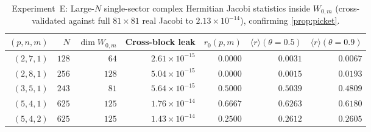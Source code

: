 \documentclass[11pt,a4paper]{article}
\numberwithin{equation}{section}
\theoremstyle{plain}
\theoremstyle{definition}
\theoremstyle{remark}
\begin{document}
\begin{table}[ht]
\centering
\caption{Experiment~E: Large-$N$ single-sector complex Hermitian Jacobi statistics inside $W_{0,m}$ (cross-validated against full $81\times 81$ real Jacobi to $2.13\times 10^{-14}$), confirming \cref{prop:picket}.}
\label{tab:frontier}
\footnotesize
\setlength{\tabcolsep}{4.5pt}
\begin{tabular}{@{}rrrrrrr@{}}
\toprule
$(p, n, m)$ & $N$ & $\dim W_{0,m}$ & Cross-block leak & $r_0(p,m)$ & $\langle r \rangle(\theta{=}0.5)$ & $\langle r \rangle(\theta{=}0.9)$ \\
\midrule
$(2, 7, 1)$ & $128$ & $64$  & $2.61\times 10^{-15}$ & $0.0000$ & $0.0031$ & $0.0067$ \\
$(2, 8, 1)$ & $256$ & $128$ & $5.04\times 10^{-15}$ & $0.0000$ & $0.0015$ & $0.0193$ \\
$(3, 5, 1)$ & $243$ & $81$  & $5.64\times 10^{-15}$ & $0.5000$ & $0.5039$ & $0.4809$ \\
$(5, 4, 1)$ & $625$ & $125$ & $1.76\times 10^{-14}$ & $0.6667$ & $0.6263$ & $0.6180$ \\
$(5, 4, 2)$ & $625$ & $125$ & $1.43\times 10^{-14}$ & $0.2500$ & $\mathbf{0.2612}$ & $0.2605$ \\
\bottomrule
\end{tabular}
\end{table}
\end{document}

